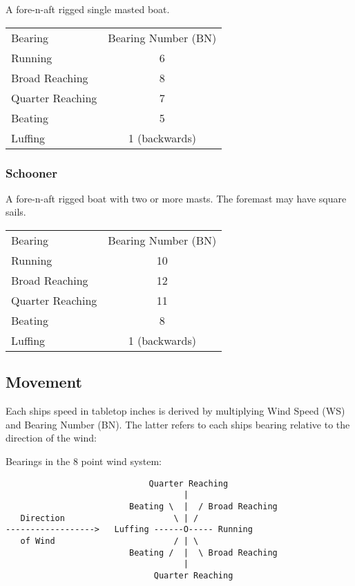 \documentclass[11pt]{wbzine}
\begin{document}
\begin{multicols}{2}
A fore-n-aft rigged single masted boat.

\begin{tabularx}{\columnwidth}{Zc}
Bearing & Bearing Number (BN) \\
Running & 6 \\
Broad Reaching & 8 \\
Quarter Reaching & 7 \\
Beating & 5 \\
Luffing & 1 (backwards) \\
\end{tabularx}

\subsubsection{Schooner}

A fore-n-aft rigged boat with two or more masts. The foremast may have
square sails.

\begin{tabularx}{\columnwidth}{Zc}
Bearing & Bearing Number (BN) \\
Running & 10 \\
Broad Reaching & 12 \\
Quarter Reaching & 11 \\
Beating & 8 \\
Luffing & 1 (backwards) \\
\end{tabularx}

\end{multicols}

\subsection{Movement}

Each ships speed in tabletop inches is derived by multiplying Wind Speed
(WS) and Bearing Number (BN). The latter refers to each ships bearing
relative to the direction of the wind:

Bearings in the 8 point wind system:

\begin{verbatim}
                             Quarter Reaching
                                    |
                         Beating \  |  / Broad Reaching
   Direction                      \ | /
------------------>   Luffing ------O----- Running
   of Wind                        / | \
                         Beating /  |  \ Broad Reaching
                                    |
                              Quarter Reaching
\end{verbatim}
\end{document}
